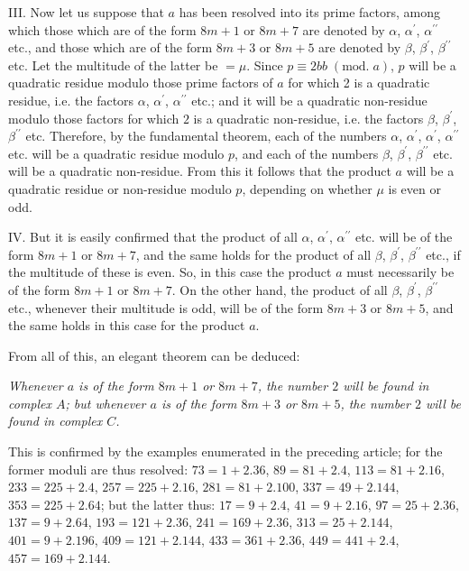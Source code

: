 \documentclass[twoside,12pt]{memoir}
\renewcommand{\pmod}[1]{\;(\textrm{mod.}\;#1)}
\begin{document}
III. Now let us suppose that \(a\) has been resolved into its prime factors, among which those which are of the form \(8 m+1\) or \(8 m+7\) are denoted by \(\alpha\), \(\alpha^{\prime}\), \(\alpha^{\prime \prime}\) etc{.}, and those which are of the form \(8 m+3\) or \(8 m+5\) are denoted by \(\beta\), \(\beta^{\prime}\), \(\beta^{\prime \prime}\) etc.  Let the multitude of the latter be \(=\mu\). Since \(p \equiv 2 b b \pmod{a}\), \(p\) will be a quadratic residue modulo those prime factors of \(a\) for which 2 is a quadratic residue, i{.}e{.} the factors \(\alpha\), \(\alpha^{\prime}\), \(\alpha^{\prime \prime}\) etc{.}; and it will be a quadratic non-residue modulo those factors for which \(2\) is a quadratic non-residue, i{.}e{.} the factors \(\beta\), \(\beta^{\prime}\), \(\beta^{\prime \prime}\) etc{.}  Therefore, by the fundamental theorem, each of the numbers \(\alpha\), \(\alpha^{\prime}\), \(\alpha^{\prime}\), \(\alpha^{\prime \prime}\) etc{.} will be a quadratic residue modulo \(p\), and each of the numbers \(\beta\), \(\beta^{\prime}\), \(\beta^{\prime \prime}\) etc{.} will be a quadratic non-residue. From this it follows that the product \(a\) will be a quadratic residue or non-residue modulo \(p\), depending on whether \(\mu\) is even or odd.

IV. But it is easily confirmed that the product of all \(\alpha\), \(\alpha^{\prime}\), \(\alpha^{\prime \prime}\) etc{.} will be of the form \(8 m+1\) or \(8 m+7\), and the same holds for the product of all \(\beta\), \(\beta^{\prime}\), \(\beta^{\prime \prime}\) etc{.}, if the multitude of these is even.  So, in this case the product \(a\) must necessarily be of the form \(8 m+1\) or \(8 m+7\).  On the other hand, the product of all \(\beta\), \(\beta^{\prime}\), \(\beta^{\prime \prime}\) etc{.}, whenever their multitude is odd, will be of the form \(8 m+3\) or \(8 m+5\), and the same holds in this case for the product \(a\).
%

From all of this, an elegant theorem can be deduced:

\textit{Whenever \(a\) is of the form \(8m+1\) or \(8m+7\), the number \(2\) will be found in complex \(A\); but whenever \(a\) is of the form \(8m+3\) or \(8m+5\), the number \(2\) will be found in complex \(C\).}

This is confirmed by the examples enumerated in the preceding article; for the former moduli are thus resolved: \(73=1+2.36\), \(89=81+2.4\), \(113=81+2.16\), \(233=225+2.4\), \(257=225+2.16\), \(281=81+2.100\), \(337=49+2.144\), \(353=225+2.64\); but the latter thus: \(17=9+2.4\), \(41=9+2.16\), \(97=25+2.36\), \(137=9+2.64\), \(193=121+2.36\), \(241=169+2.36\), \(313=25+2.144\), \(401=9+2.196\), \(409=121+2.144\), \(433=361+2.36\), \(449=441+2.4\), \(457=169+2.144\).
%
\end{document}
